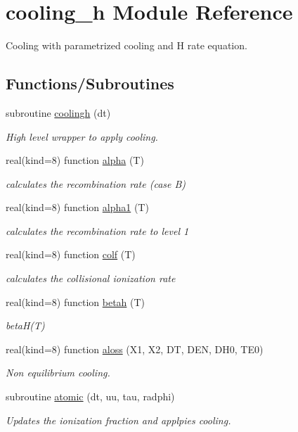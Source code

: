 \hypertarget{namespacecooling__h}{}\section{cooling\+\_\+h Module Reference}
\label{namespacecooling__h}


Cooling with parametrized cooling and H rate equation.  


\subsection*{Functions/\+Subroutines}
\begin{DoxyCompactItemize}
\item 
subroutine \hyperlink{namespacecooling__h_ad092ffe4588667ec0c7360154f3ca7ff}{coolingh} (dt)
\begin{DoxyCompactList}\small\item\em High level wrapper to apply cooling. \end{DoxyCompactList}\item 
real(kind=8) function \hyperlink{namespacecooling__h_a09de30645cebf531a647b5f53ae143b2}{alpha} (T)
\begin{DoxyCompactList}\small\item\em calculates the recombination rate (case B) \end{DoxyCompactList}\item 
real(kind=8) function \hyperlink{namespacecooling__h_a5454f21ef468add797c58753a1e0c773}{alpha1} (T)
\begin{DoxyCompactList}\small\item\em calculates the recombination rate to level 1 \end{DoxyCompactList}\item 
real(kind=8) function \hyperlink{namespacecooling__h_ad5f1352f8925ccb1b352d6e749465a92}{colf} (T)
\begin{DoxyCompactList}\small\item\em calculates the collisional ionization rate \end{DoxyCompactList}\item 
real(kind=8) function \hyperlink{namespacecooling__h_a2a2de25572bd515eae9441391e0ed0f8}{betah} (T)
\begin{DoxyCompactList}\small\item\em beta\+H(\+T) \end{DoxyCompactList}\item 
real(kind=8) function \hyperlink{namespacecooling__h_a92cfd14c9b02e853eb33d22857fabeed}{aloss} (X1, X2, D\+T, D\+E\+N, D\+H0, T\+E0)
\begin{DoxyCompactList}\small\item\em Non equilibrium cooling. \end{DoxyCompactList}\item 
subroutine \hyperlink{namespacecooling__h_aef95dbca5e7aef78d66a225cc217c982}{atomic} (dt, uu, tau, radphi)
\begin{DoxyCompactList}\small\item\em Updates the ionization fraction and applpies cooling. \end{DoxyCompactList}\end{DoxyCompactItemize}


